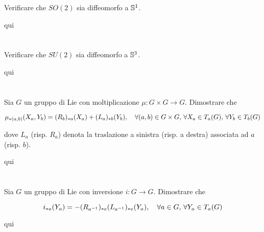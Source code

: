 \begin{tcolorbox}
	Verificare che $ SO(2) $ sia diffeomorfo a $ \S^{1} $.
\end{tcolorbox}

qui

\tocless\section{}\label{BONUS3-2}

\begin{tcolorbox}
	Verificare che $ SU(2) $ sia diffeomorfo a $ \S^{3} $.
\end{tcolorbox}

qui

\tocless\section{}\label{es3-7}

\begin{tcolorbox}
	Sia $ G $ un gruppo di Lie con moltiplicazione $ \mu : G \times G \to G $. Dimostrare che
	
	\begin{equation}
		\mu_{*(a,b)}(X_{a},Y_{b}) = (R_{b})_{*a}(X_{a}) + (L_{a})_{*b}(Y_{b}) \qcomma \forall (a,b) \in G \times G, \, \forall X_{a} \in T_{a}(G), \, \forall Y_{b} \in T_{b}(G)
	\end{equation}

	dove $ L_{a} $ (risp. $ R_{a} $) denota la traslazione a sinistra (risp. a destra) associata ad $ a $ (risp. $ b $).
\end{tcolorbox}

qui

\tocless\section{}\label{es3-8}

\begin{tcolorbox}
		Sia $ G $ un gruppo di Lie con inversione $ i : G \to G $. Dimostrare che
	
	\begin{equation}
		i_{*a}(Y_{a}) = -(R_{a^{-1}})_{*e}(L_{a^{-1}})_{*e} (Y_{a}) \qcomma \forall a \in G, \, \forall Y_{a} \in T_{a}(G)
	\end{equation}
\end{tcolorbox}

qui

\tocless\section{}\label{es3-9}

